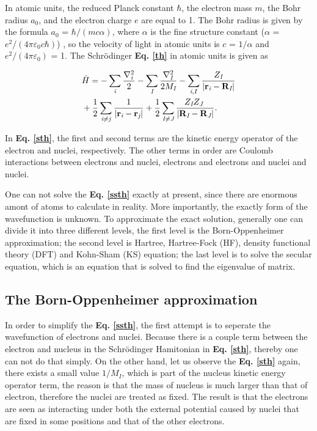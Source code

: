 \documentclass[a4paper, 12pt, titlepage,oneside,drop]{kthesis}
\begin{document}
In atomic units, the reduced Planck constant $\hbar$, the electron mass $m$, the Bohr radius $a_0$, and the electron charge
$e$ are equal to 1. The Bohr radius is given by the formula $a_0$ = ${\hbar} / {(mc\alpha)}$, where $\alpha$ is the fine structure
constant ($\alpha$ = ${e^2}/{(4 \pi \varepsilon_0 c \hbar)}$) , so the velocity of light in atomic units is $c$ = $1/{\alpha}$ and ${e^2}/{(4 \pi \varepsilon_0)}$ = 1. The Schrödinger \textbf{Eq. \ref{th}} in atomic units is given as

\begin{equation}\label{sth}\begin{split}
&\hath = - \sumi<i>   \frac{{{\nabla}_{\textit{i}}^{2}}}{2} - \sumi<I> \frac{{{\nabla}_{\textit{I}}^{2}}}{2 M_\textit{I}}  - \sumij<i><I> \frac{Z_\textit{I}}{|\textbf{r}_\textit{i}-\textbf{R}_\textit{I}|} \\
& + \frac{1}{2} \suminj<i><j> \frac{1}{ |\textbf{r}_\textit{i}-\textbf{r}_\textit{j}|} + \frac{1}{2} \suminj<I><J> \frac{Z_\textit{I} Z_\textit{J}\ }{|\textbf{R}_\textit{I}-\textbf{R}_\textit{J}|}.
\end{split}\end{equation}

In \textbf{Eq. \ref{sth}}, the first and second terms are the kinetic energy operator of the electron and nuclei, respectively.
The other terms in order are Coulomb interactions between electrons and nuclei, electrons and electrons and nuclei and nuclei.

One can not solve the \textbf{Eq. \ref{ssth}} exactly at present, since there are enormous amont of atoms to calculate in reality. More importantly, the exactly form of the wavefunction is unknown.
To approximate the exact solution, generally one can divide it into three different levels, the first level is the Born-Oppenheimer approximation; the second level is Hartree,
Hartree-Fock (HF), density functional theory (DFT) and Kohn-Sham (KS) equation; the last level is to solve the secular equation, which is an equation that is solved to find the eigenvalue of matrix.

\subsection{The Born-Oppenheimer approximation}
\label{ch:boa}

In order to simplify the \textbf{Eq. \ref{ssth}}, the first attempt is to seperate the wavefunction of electrons and nuclei. Because there is a couple term between the electron and nucleus in the Schrödinger Hamitonian in \textbf{Eq. \ref{sth}}, 
thereby one can not do that simply. On the other hand, let us observe the \textbf{Eq. \ref{sth}} again, there exists a small value ${1}/{M_I}$, which is part of the nucleus kinetic energy
operator term, the reason is that the mass of nucleus is much larger than that of electron, therefore the nuclei are treated as fixed. The result is that the electrons are seen as interacting under both the external potential caused by nuclei that are fixed in 
some positions and that of the other electrons. 
\end{document}
